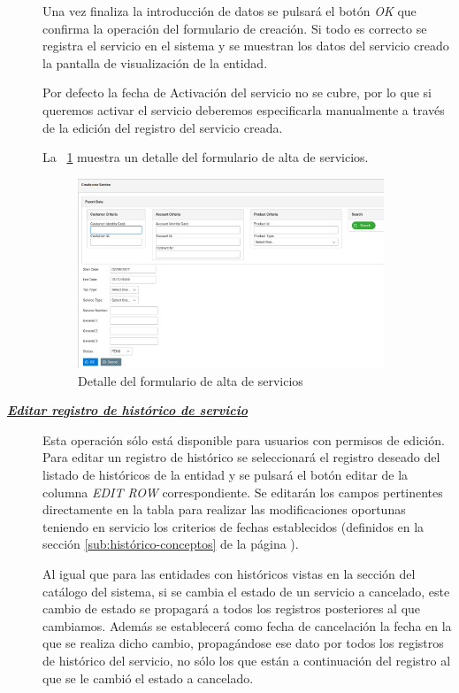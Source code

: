 \begin{description}
Una vez finaliza la introducción de datos se pulsará el botón \emph{OK} que confirma la operación del formulario de creación. Si todo es correcto se registra el servicio en el sistema y se muestran los datos del servicio creado la pantalla de visualización de la entidad.

Por defecto la fecha de Activación del servicio no se cubre, por lo que si queremos activar el servicio deberemos especificarla manualmente a través de la edición del registro del servicio creada.

La \figurename~\ref{fig:formulario-alta-servicio} muestra un detalle del formulario de alta de servicios.

\begin{figure}
  \centering
  \includegraphics[width=0.9\textwidth]{imaxes/formulario-alta-servicio.png}
  \caption{Detalle del formulario de alta de servicios}
  \label{fig:formulario-alta-servicio}
\end{figure}


\item[\underline{\textsl{\textbf{Editar registro de histórico de servicio}}}] Esta operación sólo está disponible para usuarios con permisos de edición.
Para editar un registro de histórico se seleccionará el registro deseado del listado de históricos de la entidad y se pulsará el botón editar de la columna \textit{EDIT ROW} correspondiente. Se editarán los campos pertinentes directamente en la tabla para realizar las modificaciones oportunas teniendo en servicio los criterios de fechas establecidos (definidos en la sección \ref{sub:histórico-conceptos} de la página \pageref{sub:histórico-conceptos}).

Al igual que para las entidades con históricos vistas en la sección del catálogo del sistema, si se cambia el estado de un servicio a cancelado, este cambio de estado se propagará a todos los registros posteriores al que cambiamos. Además se establecerá como fecha de cancelación la fecha en la que se realiza dicho cambio, propagándose ese dato por todos los registros de histórico del servicio, no sólo los que están a continuación del registro al que se le cambió el estado a cancelado.


\end{description}

